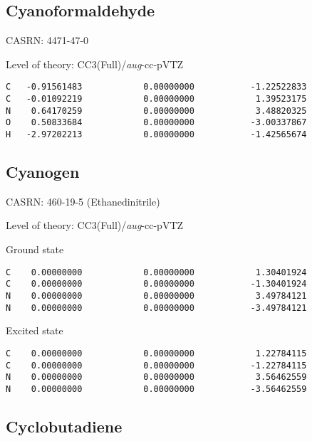 \documentclass[journal=jctcce,manuscript=article,layout=traditional]{achemso}
\newcommand{\AVTZ}{\emph{aug}-cc-pVTZ}
\begin{document}
\subsection{Cyanoformaldehyde}

CASRN: 4471-47-0

\begin{singlespace}
\noindent Level of theory: CC3(Full)/{\AVTZ}
\begin{verbatim}
C   -0.91561483            0.00000000           -1.22522833
C   -0.01092219            0.00000000            1.39523175
N    0.64170259            0.00000000            3.48820325
O    0.50833684            0.00000000           -3.00337867
H   -2.97202213            0.00000000           -1.42565674
\end{verbatim}
\end{singlespace}

\subsection{Cyanogen}

CASRN: 460-19-5 (Ethanedinitrile)

\begin{singlespace}
\noindent Level of theory: CC3(Full)/{\AVTZ}
\end{singlespace}

\begin{singlespace}
\noindent Ground state
\begin{verbatim}
C    0.00000000            0.00000000            1.30401924
C    0.00000000            0.00000000           -1.30401924
N    0.00000000            0.00000000            3.49784121
N    0.00000000            0.00000000           -3.49784121
\end{verbatim}
\end{singlespace}

\begin{singlespace}
\noindent Excited state
\begin{verbatim}
C    0.00000000            0.00000000            1.22784115
C    0.00000000            0.00000000           -1.22784115
N    0.00000000            0.00000000            3.56462559
N    0.00000000            0.00000000           -3.56462559
\end{verbatim}
\end{singlespace}


\subsection{Cyclobutadiene}
\end{document}
